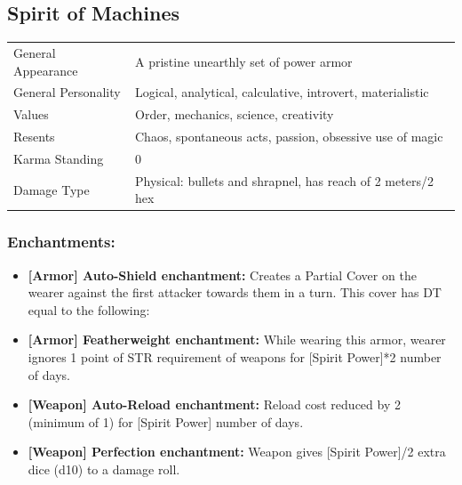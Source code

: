 \documentclass[11pt,a4paper,twocolumn]{book}
\begin{document}
\subsection*{Spirit of Machines}
{
	\begin{tabu} to 75mm{| X[l,4] | X[l,8] |}
		\hline
		General Appearance		& A pristine unearthly set of power armor						\\
        General Personality	   	& Logical, analytical, calculative, introvert, materialistic	\\
        Values     				& Order, mechanics, science, creativity							\\
        Resents     			& Chaos, spontaneous acts, passion, obsessive use of magic 		\\
        Karma Standing      	& 0																\\
        Damage Type 			& Physical: bullets and shrapnel, has reach of 2 meters/2 hex	 \\ \hline
	\end{tabu}
		
}

\medskip

\subsubsection*{Enchantments:} 
\begin{itemize}
\item \textbf{ [Armor] Auto-Shield enchantment:} Creates a Partial Cover on the wearer against the first attacker towards them in a turn. This cover has DT equal to the following:
\item \textbf{ [Armor] Featherweight enchantment:} While wearing this armor, wearer ignores 1 point of STR requirement of weapons for [Spirit Power]*2 number of days.
\item \textbf{ [Weapon] Auto-Reload enchantment:} Reload cost reduced by 2 (minimum of 1) for [Spirit Power] number of days.
\item \textbf{ [Weapon] Perfection enchantment:} Weapon gives [Spirit Power]/2 extra dice (d10) to a damage roll.
\end{itemize}
\end{document}
